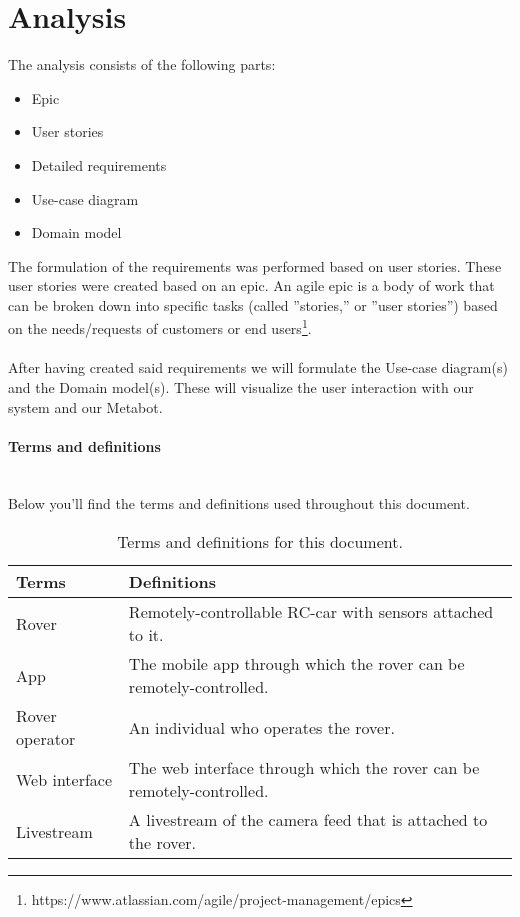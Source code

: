 \documentclass[12pt]{article}
\begin{document}
	\section{Analysis}
	The analysis consists of the following parts:
	\begin{itemize}
		\item Epic
		\item User stories
		\item Detailed requirements
		\item Use-case diagram
		\item Domain model\\
	\end{itemize}	
	The formulation of the requirements was performed based on user stories. These user stories were created based on an epic. An agile epic is a body of work that can be broken down into specific tasks (called ''stories,'' or ''user stories'') based on the needs/requests of customers or end users\footnote{https://www.atlassian.com/agile/project-management/epics}.\\
	\\After having created said requirements we will formulate the Use-case diagram(s) and the Domain model(s). These will visualize the user interaction with our system and our Metabot.
	\paragraph{Terms and definitions}\mbox{}\\
	Below you'll find the terms and definitions used throughout this document.
	\FloatBarrier
	\begin{table}[h]
		\centering
		\begin{tabularx}{\linewidth}{|X|X|}
			\hline
			\textbf{Terms} &\textbf{Definitions}\\
			\hline
			Rover &Remotely-controllable RC-car with sensors attached to it.\\
			\hline
			App &The mobile app through which the rover can be remotely-controlled.\\
			\hline
			Rover operator &An individual who operates the rover.\\
			\hline
			Web interface &The web interface through which the rover can be remotely-controlled. \\
			\hline 
			Livestream &A livestream of the camera feed that is attached to the rover.\\
			\hline
		\end{tabularx}
		\caption{Terms and definitions for this document.}
		\label{table:termsDefinition}   
	\end{table}
	\FloatBarrier
	\newpage
\end{document}
